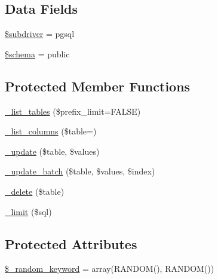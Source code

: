 \subsection*{Data Fields}
\begin{DoxyCompactItemize}
\item 
\mbox{\hyperlink{class_c_i___d_b__pdo__pgsql__driver_a1322ca756348b11d080cb7a4f590de15}{\$subdriver}} = \textquotesingle{}pgsql\textquotesingle{}
\item 
\mbox{\hyperlink{class_c_i___d_b__pdo__pgsql__driver_a83022b1d70799d2bde3d64dca9cb40ee}{\$schema}} = \textquotesingle{}public\textquotesingle{}
\end{DoxyCompactItemize}
\subsection*{Protected Member Functions}
\begin{DoxyCompactItemize}
\item 
\mbox{\hyperlink{class_c_i___d_b__pdo__pgsql__driver_a435c0f3ce54fe7daa178baa8532ebd54}{\+\_\+list\+\_\+tables}} (\$prefix\+\_\+limit=F\+A\+L\+SE)
\item 
\mbox{\hyperlink{class_c_i___d_b__pdo__pgsql__driver_a7ccb7f9c301fe7f0a9db701254142b63}{\+\_\+list\+\_\+columns}} (\$table=\textquotesingle{}\textquotesingle{})
\item 
\mbox{\hyperlink{class_c_i___d_b__pdo__pgsql__driver_a2540b03a93fa73ae74c10d0e16fc073e}{\+\_\+update}} (\$table, \$values)
\item 
\mbox{\hyperlink{class_c_i___d_b__pdo__pgsql__driver_a336b9ebb119e47b6a84bb7fc9d4dae93}{\+\_\+update\+\_\+batch}} (\$table, \$values, \$index)
\item 
\mbox{\hyperlink{class_c_i___d_b__pdo__pgsql__driver_a133ea8446ded52589bd22cc9163d0896}{\+\_\+delete}} (\$table)
\item 
\mbox{\hyperlink{class_c_i___d_b__pdo__pgsql__driver_a3a02ea06541b8ecc25a33a61651562c8}{\+\_\+limit}} (\$sql)
\end{DoxyCompactItemize}
\subsection*{Protected Attributes}
\begin{DoxyCompactItemize}
\item 
\mbox{\hyperlink{class_c_i___d_b__pdo__pgsql__driver_a10213aa6e05f6d924d3277bb1d2fea00}{\$\+\_\+random\+\_\+keyword}} = array(\textquotesingle{}R\+A\+N\+D\+OM()\textquotesingle{}, \textquotesingle{}R\+A\+N\+D\+OM()\textquotesingle{})
\end{DoxyCompactItemize}


